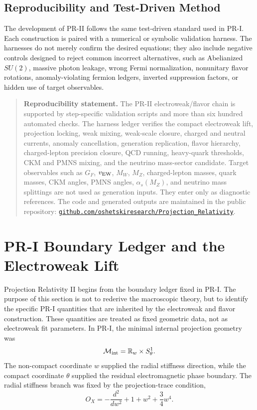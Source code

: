 \documentclass[11pt]{article}
\begin{document}
\subsection{Reproducibility and Test-Driven Method}
\label{sec:intro_reproducibility}

The development of PR-II follows the same test-driven standard used in PR-I. Each construction is paired with a numerical or symbolic validation harness. The harnesses do not merely confirm the desired equations; they also include negative controls designed to reject common incorrect alternatives, such as Abelianized \(SU(2)\), massive photon leakage, wrong Fermi normalization, nonunitary flavor rotations, anomaly-violating fermion ledgers, inverted suppression factors, or hidden use of target observables.

\begin{quote}
\small
\textbf{Reproducibility statement.}
The PR-II electroweak/flavor chain is supported by step-specific validation scripts and more than six hundred automated checks. The harness ledger verifies the compact electroweak lift, projection locking, weak mixing, weak-scale closure, charged and neutral currents, anomaly cancellation, generation replication, flavor hierarchy, charged-lepton precision closure, QCD running, heavy-quark thresholds, CKM and PMNS mixing, and the neutrino mass-sector candidate. Target observables such as \(G_F\), \(v_{\rm EW}\), \(M_W\), \(M_Z\), charged-lepton masses, quark masses, CKM angles, PMNS angles, \(\alpha_s(M_Z)\), and neutrino mass splittings are not used as generation inputs. They enter only as diagnostic references. The code and generated outputs are maintained in the public repository:
\href{https://github.com/oshetskiresearch/Projection_Relativity}{\texttt{github.com/oshetskiresearch/Projection\_Relativity}}.
\end{quote}

\section{PR-I Boundary Ledger and the Electroweak Lift}
\label{sec:pr2_boundary_ledger_electroweak_lift}

Projection Relativity II begins from the boundary ledger fixed in PR-I. 
The purpose of this section is not to rederive the macroscopic theory, but to identify the specific PR-I quantities that are inherited by the electroweak and flavor construction. 
These quantities are treated as fixed geometric data, not as electroweak fit parameters. In PR-I, the minimal internal projection geometry was
\begin{equation}
\mathcal M_{\rm int}
=
\mathbb R_w
\times
S^1_\theta .
\end{equation}
The non-compact coordinate \(w\) supplied the radial stiffness direction, while the compact coordinate \(\theta\) supplied the residual electromagnetic phase boundary. 
The radial stiffness branch was fixed by the projection-trace condition,
\begin{equation}
O_X
=
-\frac{d^2}{dw^2}
+
1+w^2+\frac34 w^4.
\end{equation}
\end{document}
